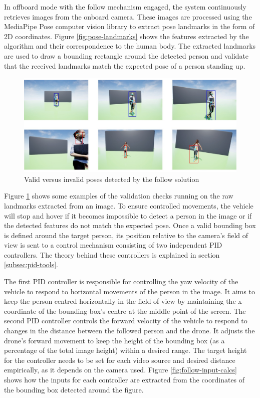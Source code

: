 In offboard mode with the follow mechanism engaged, the system continuously retrieves images from the onboard camera. These images are processed using the MediaPipe Pose \cite{mp-pose-paper} computer vision library to extract pose landmarks in the form of 2D coordinates. 
Figure \ref{fig:pose-landmarks} shows the features extracted by the algorithm and their correspondence to the human body.
The extracted landmarks are used to draw a bounding rectangle around the detected person and validate that the received landmarks match the expected pose of a person standing up.

\begin{figure}
  \centering
  \includegraphics[width=\textwidth, keepaspectratio]{img/pose-validation.jpg}
  \caption{Valid versus invalid poses detected by the follow solution}
  \label{fig:pose-validation}
\end{figure}

Figure \ref{fig:pose-validation} shows some examples of the validation checks running on the raw landmarks extracted from an image.
To ensure controlled movements, the vehicle will stop and hover if it becomes impossible to detect a person in the image or if the detected features do not match the expected pose. Once a valid bounding box is defined around the target person, its position relative to the camera's field of view is sent to a control mechanism consisting of two independent PID controllers. The theory behind these controllers is explained in section \ref{subsec:pid-tools}.

The first PID controller is responsible for controlling the yaw velocity of the vehicle to respond to horizontal movements of the person in the image. It aims to keep the person centred horizontally in the field of view by maintaining the x-coordinate of the bounding box's centre at the middle point of the screen.
The second PID controller controls the forward velocity of the vehicle to respond to changes in the distance between the followed person and the drone. It adjusts the drone's forward movement to keep the height of the bounding box (as a percentage of the total image height) within a desired range. The target height for the controller needs to be set for each video source and desired distance empirically, as it depends on the camera used.
Figure \ref{fig:follow-input-calcs} shows how the inputs for each controller are extracted from the coordinates of the bounding box detected around the figure.

